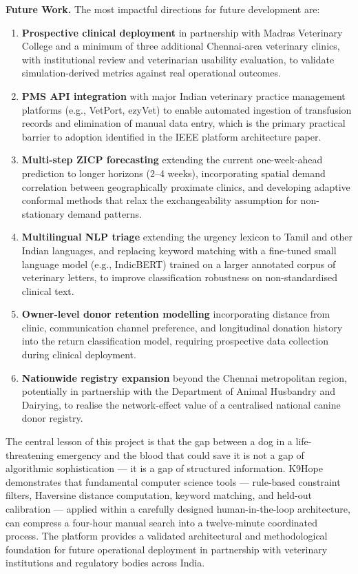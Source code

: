 \documentclass[12pt,a4paper]{article}
\begin{document}
\vspace{1.5em}
\noindent\textbf{Future Work.} The most impactful directions for future development are:

\begin{enumerate}[leftmargin=1.8em, itemsep=0.4em]
    \item \textbf{Prospective clinical deployment} in partnership with Madras Veterinary College and a minimum of three additional Chennai-area veterinary clinics, with institutional review and veterinarian usability evaluation, to validate simulation-derived metrics against real operational outcomes.
    \item \textbf{PMS API integration} with major Indian veterinary practice management platforms (e.g., VetPort, ezyVet) to enable automated ingestion of transfusion records and elimination of manual data entry, which is the primary practical barrier to adoption identified in the IEEE platform architecture paper.
    \item \textbf{Multi-step ZICP forecasting} extending the current one-week-ahead prediction to longer horizons (2--4 weeks), incorporating spatial demand correlation between geographically proximate clinics, and developing adaptive conformal methods that relax the exchangeability assumption for non-stationary demand patterns.
    \item \textbf{Multilingual NLP triage} extending the urgency lexicon to Tamil and other Indian languages, and replacing keyword matching with a fine-tuned small language model (e.g., IndicBERT) trained on a larger annotated corpus of veterinary letters, to improve classification robustness on non-standardised clinical text.
    \item \textbf{Owner-level donor retention modelling} incorporating distance from clinic, communication channel preference, and longitudinal donation history into the return classification model, requiring prospective data collection during clinical deployment.
    \item \textbf{Nationwide registry expansion} beyond the Chennai metropolitan region, potentially in partnership with the Department of Animal Husbandry and Dairying, to realise the network-effect value of a centralised national canine donor registry.
\end{enumerate}

\vspace{1.5em}
\noindent The central lesson of this project is that the gap between a dog in a life-threatening emergency and the blood that could save it is not a gap of algorithmic sophistication — it is a gap of structured information. K9Hope demonstrates that fundamental computer science tools — rule-based constraint filters, Haversine distance computation, keyword matching, and held-out calibration — applied within a carefully designed human-in-the-loop architecture, can compress a four-hour manual search into a twelve-minute coordinated process. The platform provides a validated architectural and methodological foundation for future operational deployment in partnership with veterinary institutions and regulatory bodies across India.
\end{document}
